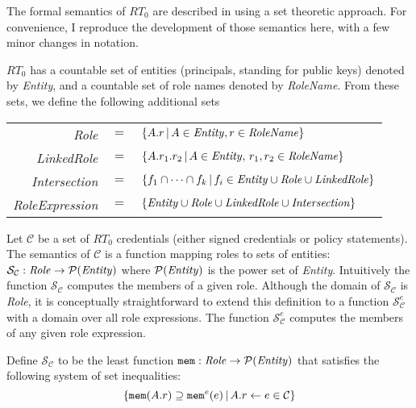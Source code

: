 \documentclass{article}
\begin{document}
The formal semantics of $RT_0$ are described in \cite{Li:2003-02} using a set theoretic
approach. For convenience, I reproduce the development of those semantics here, with a few minor
changes in notation.

$RT_0$ has a countable set of entities (principals, standing for public keys) denoted by
\textit{Entity}, and a countable set of role names denoted by \textit{RoleName}. From these
sets, we define the following additional sets

\begin{tabular}{rcl}
  \textit{Role} & $=$ & 
  $\{ A.r\, |\, A \in \mbox{\textit{Entity}}, r \in \mbox{\textit{RoleName}} \}$ \\
  \textit{LinkedRole} & $=$ &
  $\{ A.r_1.r_2\, |\, A \in \mbox{\textit{Entity}},\, r_1, r_2 \in \mbox{\textit{RoleName}} \}$ \\
  \textit{Intersection} & $=$ &
  $\{ f_1 \cap \cdots \cap f_k\, |\, f_i \in \mbox{\textit{Entity}} \cup \mbox{\textit{Role}} \cup \mbox{\textit{LinkedRole}} \}$ \\
  \textit{RoleExpression} & $=$ &
  $\{ \mbox{\textit{Entity}} \cup \mbox{\textit{Role}} \cup \mbox{\textit{LinkedRole}} \cup \mbox{\textit{Intersection}} \}$
\end{tabular}

Let $\mathcal{C}$ be a set of $RT_0$ credentials (either signed credentials or policy
statements). The semantics of $\mathcal{C}$ is a function mapping roles to sets of entities:
$\mathcal{S}_\mathcal{C} : \mbox{\textit{Role}} \rightarrow \mathcal{P}(\mbox{\textit{Entity}})$
where $\mathcal{P}(\mbox{\textit{Entity}})$ is the power set of \textit{Entity}. Intuitively the
function $\mathcal{S}_\mathcal{C}$ computes the members of a given role. Although the domain of
$\mathcal{S}_\mathcal{C}$ is \textit{Role}, it is conceptually straightforward to extend this
definition to a function $\mathcal{S}_\mathcal{C}^e$ with a domain over all role expressions.
The function $\mathcal{S}_\mathcal{C}^e$ computes the members of any given role expression.

Define $\mathcal{S}_\mathcal{C}$ to be the least function $\mbox{\texttt{mem}} :
\mbox{\textit{Role}} \rightarrow \mathcal{P}(\mbox{\textit{Entity}})$ that satisfies the
following system of set inequalities:
\begin{displaymath}
\{ \mbox{\texttt{mem}}(A.r) \supseteq \mbox{\texttt{mem}}^e(e)\,|\, A.r \leftarrow e \in \mathcal{C} \}
\end{displaymath}
\end{document}
